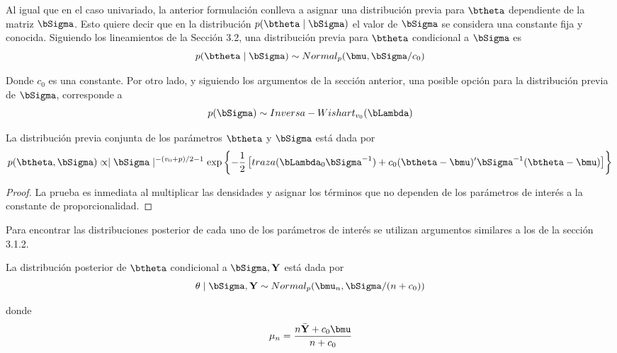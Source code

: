 \documentclass[10pt,openright]{book}\usepackage[]{graphicx}\usepackage[]{color}
\begin{document}
Al igual que en el caso univariado, la anterior formulaci\'on conlleva a asignar una distribuci\'on previa para $\btheta$ dependiente de la matriz $\bSigma$. Esto quiere decir que en la distribuci\'on $p(\btheta \mid \bSigma)$ el valor de $\bSigma$ se considera una constante fija y conocida. Siguiendo los lineamientos de la Secci\'on 3.2, una distribuci\'on previa para $\btheta$  condicional a $\bSigma$ es
\begin{equation*}
p(\btheta \mid \bSigma)\sim Normal_p(\bmu,\bSigma/c_0)
\end{equation*}

Donde $c_0$ es una constante. Por otro lado, y siguiendo los argumentos de la secci\'on anterior, una posible opci\'on para la distribuci\'on previa de $\bSigma$, corresponde a
\begin{equation*}
p(\bSigma)\sim Inversa-Wishart_{v_0}(\bLambda)
\end{equation*}

\begin{Res}
La distribuci\'on previa conjunta de los par\'ametros $\btheta$ y $\bSigma$ est\'a dada por
\begin{equation*}
p(\btheta,\bSigma) \propto \mid \bSigma \mid ^{-(v_0+p)/2-1}
\exp\left\{ -\frac{1}{2}\left[traza(\bLambda_0\bSigma^{-1})+
c_0(\btheta-\bmu)'\bSigma^{-1}(\btheta-\bmu)\right]\right\}
\end{equation*}
\end{Res}
                              
\begin{proof}
La prueba es inmediata al multiplicar las densidades y asignar los t\'erminos que no dependen de los par\'ametros de inter\'es a la constante de proporcionalidad.
\end{proof}
                              
Para encontrar las distribuciones posterior de cada uno de los par\'ametros de inter\'es se utilizan argumentos similares a los de la secci\'on 3.1.2.
                              
\begin{Res}
La distribuci\'on posterior de $\btheta$ condicional a $\bSigma,\mathbf{Y}$ est\'a dada por
\begin{equation*}
\theta \mid \bSigma,\mathbf{Y} \sim Normal_p(\bmu_n,\bSigma/(n+c_0))
\end{equation*}

donde
\begin{equation*}
\mu_n=\frac{n\bar{\mathbf{Y}}+c_0\bmu}{n+c_0}
\end{equation*}
\end{Res}
\end{document}
